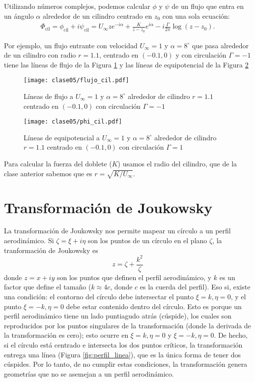 Utilizando números complejos, podemos calcular $\phi$ y $\psi$ de un flujo que entra en un ángulo $\alpha$ alrededor de un cilindro centrado en $z_0$ con una sola ecuación:
%
\begin{align} \label{eq:cilindro}
\Phi_\text{cil} = \phi_\text{cil}+i\psi_\text{cil} = U_\infty z e^{-i\alpha} + \frac{K}{z-z_0}e^{i\alpha} -i\frac{\Gamma}{2\pi} \log(z-z_0).
\end{align}

Por ejemplo, un flujo entrante con velocidad $U_\infty=1$ y $\alpha=8^\circ$ que pasa alrededor de un cilindro con radio $r=1.1$, centrado en $(-0.1,0)$ y con circulación $\Gamma=-1$ tiene las líneas de flujo de la Figura \ref{fig:flujo_cil} y las líneas de equipotencial de la Figura \ref{fig:phi_cil}
%
\begin{figure}[h!]
\centering
\texttt{[image: clase05/flujo\_cil.pdf]}
\caption{Líneas de flujo a $U_\infty=1$ y $\alpha=8^\circ$ alrededor de cilindro $r=1.1$ centrado en $(-0.1,0)$ con circulación $\Gamma=-1$}\label{fig:flujo_cil}
\end{figure}
%
\begin{figure}[h!]
\centering
\texttt{[image: clase05/phi\_cil.pdf]}
\caption{Líneas de equipotencial a $U_\infty=1$ y $\alpha=8^\circ$ alrededor de cilindro $r=1.1$ centrado en $(-0.1,0)$ con circulación $\Gamma=1$}\label{fig:phi_cil}
\end{figure}

Para calcular la fuerza del doblete ($K$) usamos el radio del cilindro, que de la clase anterior sabemos que es $r=\sqrt{K/U_\infty}$.

\section*{Transformación de Joukowsky}

La transformación de Joukowsky nos permite mapear un círculo a un perfil aerodinámico. 
Si $\zeta = \xi + i\eta$ son los puntos de un círculo en el plano $\zeta$, la tranformación de Joukowsky es
%
\begin{equation}
z = \zeta + \frac{k^2}{\zeta}
\end{equation}
%
donde $z=x+iy$ son los puntos que definen el perfil aerodinámico, y $k$ es un factor que define el tamaño ($k\approx4c$, donde $c$ es la cuerda del perfil). 
Eso si, existe una condición: el contorno del círculo debe intersectar el punto $\xi=k, \eta=0$, y el punto $\xi=-k, \eta=0$ debe estar contenido dentro del círculo. 
Esto es porque un perfil aerodinámico tiene un lado puntiagudo atrás (cúspide), los cuales son reproducidos por los puntos singulares de la transformación (donde la derivada de la transformación es cero); esto ocurre en $\xi=k, \eta=0$ y $\xi=-k, \eta=0$.
De hecho, si el círculo está centrado e intersecta los dos puntos críticos, la transformación entrega una línea (Figura \ref{fig:perfil_linea}), que es la única forma de tener dos cúspides.
Por lo tanto, de no cumplir estas condiciones, la transformación genera geometrías que no se asemejan a un perfil aerodinámico.

